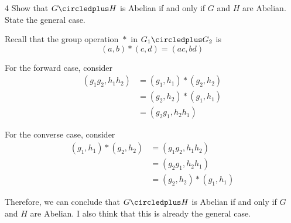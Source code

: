 \begin{hwproblem}
{4}{
    Show that \(G \circledplus H\) is Abelian if and only if \(G\) and \(H\) are Abelian. State the general case.
}

Recall that the group operation \({}*{}\) in \(G_1 \circledplus G_2\) is
\[
    (a, b) * (c, d) = (a c, b d)
\]

For the forward case, consider
\[
\begin{aligned}
    (g_1 g_2, h_1 h_2)
        &= (g_1, h_1) * (g_2, h_2) \\
        &= (g_2, h_2) * (g_1, h_1) \\
        &= (g_2 g_1, h_2 h_1)
\end{aligned}
\]

For the converse case, consider
\[
\begin{aligned}
    (g_1, h_1) * (g_2, h_2)
        &= (g_1 g_2, h_1 h_2) \\
        &= (g_2 g_1, h_2 h_1) \\
        &= (g_2, h_2) * (g_1, h_1)
\end{aligned}
\]

Therefore, we can conclude that \(G \circledplus H\) is Abelian if and only if \(G\) and \(H\) are Abelian. I also think that this is already the general case.
\end{hwproblem}

